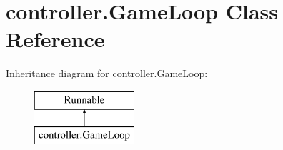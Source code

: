 \hypertarget{classcontroller_1_1_game_loop}{\section{controller.\-Game\-Loop Class Reference}
\label{classcontroller_1_1_game_loop}
}
Inheritance diagram for controller.\-Game\-Loop\-:\begin{figure}[H]
\begin{center}
\leavevmode
\includegraphics[height=2.000000cm]{classcontroller_1_1_game_loop}
\end{center}
\end{figure}
